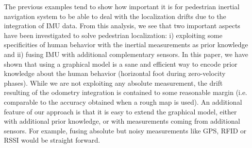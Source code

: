 
The previous  examples tend to show how important it is for pedestrian inertial navigation system to be able to deal with the localization drifts due to the integration of IMU data. 
From this analysis, we see that two important aspects have been investigated to solve pedestrian localization: i) exploiting some specificities of human behavior with the inertial measurements as prior knowledge and ii) fusing IMU with additional complementary sensors.
In this paper, we have shown that using a graphical model is a sane and efficient way to encode prior knowledge about the human behavior (horizontal foot during zero-velocity phases).
While we are not exploiting any absolute measurement, the drift resulting of the odometry integration is contained to some reasonable margin (i.e. comparable to the accuracy obtained when a rough map is used).
An additional feature of our approach is that it is easy to extend the graphical model, either with additional prior knowledge, or with measurements coming from additional sensors.
For example, fusing absolute but noisy measurements like GPS, RFID or RSSI would be straight forward.